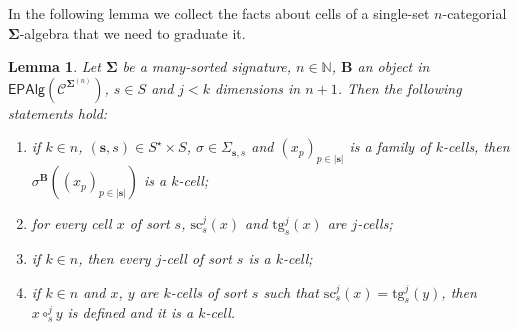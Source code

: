 \documentclass[a4paper, reqno
]{amsart}
\newcommand{\bb}[1]{\ensuremath{\lvert #1 \rvert}}
\newcommand{\sig}[1]{\mathbf{#1}}             %
\newcommand{\spec}[1]{\boldsymbol{\mathcal{#1}}} %
\newcommand{\src}{\mathrm{sc}}
\newcommand{\tgt}{\mathrm{tg}}
\theoremstyle{plain}
\newtheorem{lemma}[theorem]{Lemma}
\theoremstyle{definition}
\begin{document}
In the following lemma we collect the facts about cells of a single-set $n$-categorial $\sig{\Sigma}$-algebra that we need to graduate it.

\begin{lemma}\label{LGradCells}
Let $\sig{\Sigma}$ be a many-sorted signature, $n\in\mathbb{N}$, $\mathbf{B}$ an object in $\mathsf{EPAlg}(\spec{C}^{\sig{\Sigma}^{(n)}})$, $s\in S$ and $j<k$ dimensions in $n+1$.
Then the following statements hold:
\begin{enumerate}
\item if $k\in n$, $(\mathbf{s},s)\in S^{\star}\times S$, $\sigma\in\Sigma_{\mathbf{s},s}$ and $(x_{p})_{p\in\bb{\mathbf{s}}}$ is a family of $k$-cells, then $\sigma^{\mathbf{B}}((x_{p})_{p\in\bb{\mathbf{s}}})$ is a $k$-cell;
\item for every cell $x$ of sort $s$, $\src^{j}_{s}(x)$ and $\tgt^{j}_{s}(x)$ are $j$-cells;
\item if $k\in n$, then every $j$-cell of sort $s$ is a $k$-cell;
\item if $k\in n$ and $x$, $y$ are $k$-cells of sort $s$ such that $\src^{j}_{s}(x)=\tgt^{j}_{s}(y)$, then $x\circ^{j}_{s}y$ is defined and it is a $k$-cell.
\end{enumerate}
\end{lemma}
\end{document}
